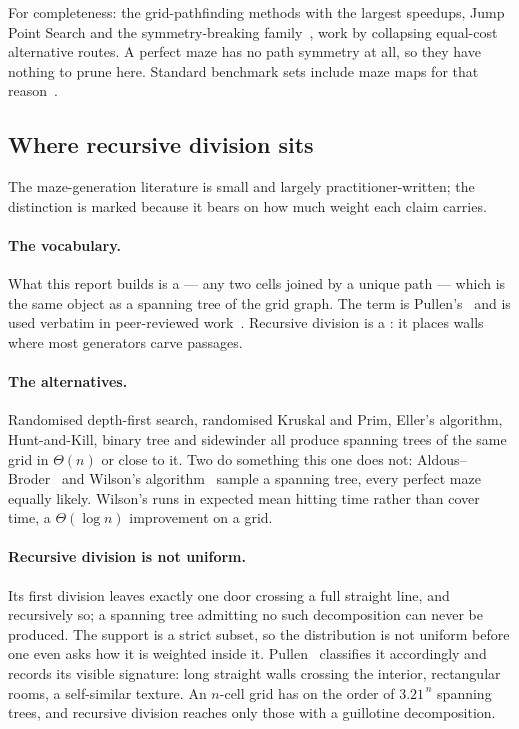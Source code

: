 For completeness: the grid-pathfinding methods with the largest speedups, Jump
Point Search and the symmetry-breaking family~\cite{harabor2011online}, work by
collapsing equal-cost alternative routes. A perfect maze has no path symmetry at
all, so they have nothing to prune here. Standard benchmark sets include maze
maps for that reason~\cite{sturtevant2012benchmarks}.

\subsection{Where recursive division sits}

The maze-generation literature is small and largely practitioner-written; the
distinction is marked because it bears on how much weight each claim carries.

\paragraph{The vocabulary.}
What this report builds is a  --- any two cells joined by a
unique path --- which is the same object as a spanning tree of the grid graph.
The term is Pullen's~\cite{pullen2026think} and is used verbatim in
peer-reviewed work~\cite{bellot2021how}. Recursive division is a
: it places walls where most generators carve passages.

\paragraph{The alternatives.}
Randomised depth-first search, randomised Kruskal and Prim, Eller's algorithm,
Hunt-and-Kill, binary tree and sidewinder all produce spanning trees of the same
grid in $\Theta(n)$ or close to it. Two do something this one does not:
Aldous--Broder~\cite{aldous1990random,broder1989generating} and
Wilson's algorithm~\cite{wilson1996generating} sample a 
spanning tree, every perfect maze equally likely. Wilson's runs in expected mean
hitting time rather than cover time, a $\Theta(\log n)$ improvement on a grid.

\paragraph{Recursive division is not uniform.}
Its first division leaves exactly one door crossing a full straight line, and
recursively so; a spanning tree admitting no such decomposition can never be
produced. The support is a strict subset, so the distribution is not uniform
before one even asks how it is weighted inside it.
Pullen~\cite{pullen2026think} classifies it accordingly and records its visible
signature: long straight walls crossing the interior, rectangular rooms, a
self-similar texture. An $n$-cell grid has on the order of $3.21^{\,n}$ spanning
trees, and recursive division reaches only those with a guillotine
decomposition.

